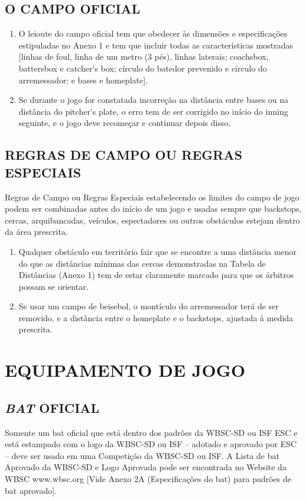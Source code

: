\subsection{O CAMPO OFICIAL}

	\begin{enumerate}[label=(\alph*)]
		\item O leioute do campo oficial tem que obedecer às dimensões e especificações estipuladas no Anexo 1 e tem que incluir todas as características mostradas	 [linhas de \gls{foul}, linha de um metro (3 pés), linhas laterais; \gls{coachsbox}, \gls{battersbox} e \gls{catcher's box}; círculo do batedor prevenido e círculo do arremessador;	 e bases e \gls{homeplate}].

		\item Se durante o jogo for constatada incorreção na distância entre bases ou na  distância do \gls{pitcher's plate}, o erro tem de ser corrigido no início do \gls{inning} seguinte, e o jogo deve recomeçar e continuar depois disso.
	\end{enumerate}

\subsection{REGRAS DE CAMPO OU REGRAS ESPECIAIS}

 Regras de Campo ou Regras Especiais estabelecendo os limites do campo de jogo podem ser combinadas antes do início de um jogo e usadas sempre que
 \glspl{backstop}, cercas, arquibancadas, veículos, espectadores ou outros obstáculos estejam dentro da área prescrita.

	\begin{enumerate}[label=(\alph*)]\item   Qualquer obstáculo em território \gls{fair} que se encontre a uma distância menor do que as distâncias mínimas das cercas demonstradas na Tabela de Distâncias (Anexo 1) tem de estar claramente marcado para que os árbitros possam se orientar.
	\item  Se usar um campo de beisebol, o montículo do arremessador terá de ser removido, e a distância entre o \gls{homeplate} e o \glspl{backstop}, ajustada à medida  prescrita.
	\end{enumerate}


\section{EQUIPAMENTO DE JOGO}

\subsection{\textit{BAT} OFICIAL}
 Somente um \gls{bat} oficial que está dentro dos padrões da WBSC-SD ou ISF \gls{ESC} e está estampado com o logo da WBSC-SD ou ISF -- adotado e aprovado por \gls{ESC} -- deve ser usado em uma Competição da WBSC-SD ou ISF. A Lista de \gls{bat} Aprovado da  WBSC-SD e Logo Aprovada pode ser encontrada no Website da WBSC www.wbsc.org [Vide Anexo 2A (Especificações do \gls{bat}) para padrões de \gls{bat} aprovado].

